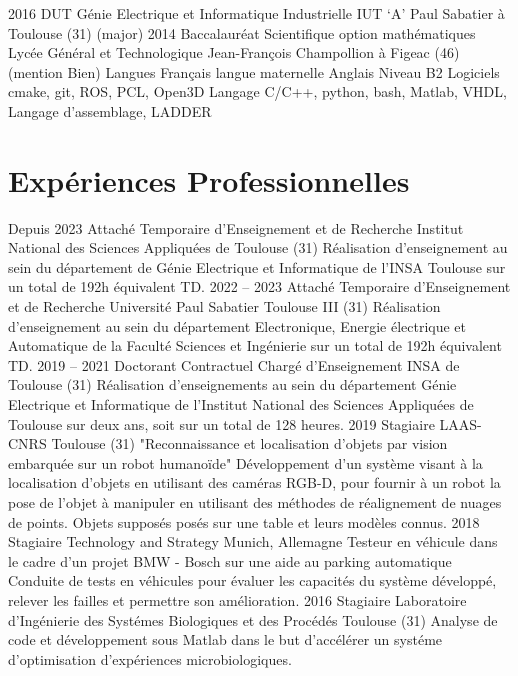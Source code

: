 \documentclass[11pt,a4paper,sans]{moderncv}         %
\begin{document}
%
\cventry
{2016}
{DUT G\'enie Electrique et Informatique Industrielle}
{IUT `A' Paul Sabatier}
{\`a Toulouse (31)}
{(major)}
{}
%
\cventry
{2014}
{Baccalaur\'eat Scientifique option math\'ematiques}
{Lyc\'ee G\'en\'eral et Technologique Jean-Fran\c cois Champollion}
{\`a Figeac (46)}
{(mention Bien)}
{}
%
\vspace*{0.5cm}
\cventry
{Langues}
{Fran\c cais}
{langue maternelle}
{}
{}
{}
%
\cventry
{}
{Anglais}
{Niveau B2}
{}
{}
{}
%
{Logiciels}
{cmake, git, ROS, PCL, Open3D}
{}
{}
{}
%
\cventry
{}
{Langage}
{C/C++, python, bash, Matlab, VHDL, Langage d'assemblage, LADDER}
{}
{}
{}
%

\section{Exp\'eriences Professionnelles}
\cventry
{Depuis 2023}
{Attach\'e Temporaire d'Enseignement et de Recherche}
{Institut National des Sciences Appliqu\'ees de Toulouse (31)}
{}
{}
{
  R\'ealisation d'enseignement au sein du d\'epartement de G\'enie Electrique et Informatique de l'INSA Toulouse sur un total de 192h \'equivalent TD.
}
%
\cventry
{2022 -- 2023}
{Attach\'e Temporaire d'Enseignement et de Recherche}
{Universit\'e Paul Sabatier Toulouse III (31)}
{}
{}
{
  R\'ealisation d'enseignement au sein du d\'epartement Electronique, Energie \'electrique et Automatique de la Facult\'e Sciences et Ing\'enierie sur un total de 192h \'equivalent TD.
}
%
\cventry
{2019 -- 2021}
{Doctorant Contractuel Charg\'e d'Enseignement}
{INSA de Toulouse (31)}
{}
{}
{
  R\'ealisation d'enseignements au sein du d\'epartement G\'enie Electrique et Informatique de l'Institut National des Sciences Appliqu\'ees de Toulouse sur deux ans, soit sur un total de 128 heures.
}
%
\cventry
{2019}
{Stagiaire}
{LAAS-CNRS}
{Toulouse (31)}
{"Reconnaissance et localisation d'objets par vision embarqu\'ee sur un robot humano\"ide"}
{
  D\'eveloppement d'un syst\`eme visant \`a la localisation d'objets en utilisant des cam\'eras RGB-D, pour fournir \`a un robot la pose de l'objet \`a manipuler en utilisant des m\'ethodes de r\'ealignement de nuages de points.
  Objets suppos\'es pos\'es sur une table et leurs mod\`eles connus.
}
%
%
\cventry
{2018}
{Stagiaire}
{Technology and Strategy}
{Munich, Allemagne}
{Testeur en v\'ehicule dans le cadre d'un projet BMW - Bosch sur une aide au parking automatique}
{
  Conduite de tests en v\'ehicules pour \'evaluer les capacit\'es du syst\`eme d\'evelopp\'e, relever les failles et permettre son am\'elioration.
}
%
%
\cventry
{2016}
{Stagiaire}
{Laboratoire d'Ing\'enierie des Syst\'emes Biologiques et des Proc\'ed\'es}
{Toulouse (31)}
{}
{
  Analyse de code et d\'eveloppement sous Matlab dans le but d'acc\'el\'erer un syst\'eme d'optimisation d'exp\'eriences microbiologiques.
}
%
\end{document}
